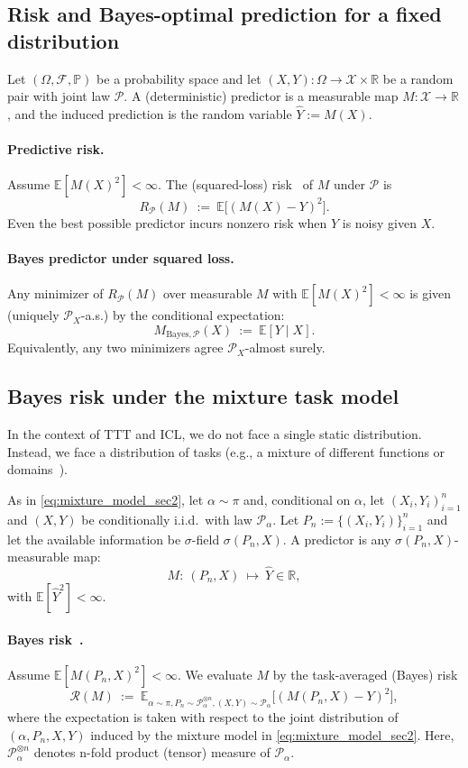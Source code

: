 \documentclass{article}
\theoremstyle{plain}
\theoremstyle{definition}
\theoremstyle{remark}
\begin{document}
\subsection{Risk and Bayes-optimal prediction for a fixed distribution}
Let $(\Omega,\mathcal F,\mathbb P)$ be a probability space and let $(X,Y):\Omega\to\mathcal X\times\mathbb R$ be a random pair with joint law $\mathcal P$.
A (deterministic) predictor is a measurable map $M:\mathcal X\to\mathbb R$, and the induced prediction is the random variable $\widehat Y:=M(X)$.


\paragraph{Predictive risk.}
Assume $\mathbb E[M(X)^2]<\infty$. The (squared-loss) risk~\citep{Bishop2006PRML,Murphy2022intro} of $M$ under $\mathcal P$ is
\[
    R_{\mathcal P}(M)\ :=\ \mathbb E\bigl[(M(X)-Y)^2\bigr].
\]
Even the best possible predictor incurs nonzero risk when $Y$ is noisy given $X$.

\paragraph{Bayes predictor under squared loss.}
Any minimizer of $R_{\mathcal P}(M)$ over measurable $M$ with $\mathbb E[M(X)^2]<\infty$ is given (uniquely $\mathcal P_X$-a.s.) by the conditional expectation:
\[
    M_{\mathrm{Bayes},\mathcal P}(X)\ :=\ \mathbb E[Y\mid X].
\]
Equivalently, any two minimizers agree $\mathcal P_X$-almost surely.


\subsection{Bayes risk under the mixture task model}
In the context of TTT and ICL, we do not face a single static distribution. Instead, we face a distribution of tasks (e.g., a mixture of different functions or domains~\citep{wakayama2025context}).

As in \eqref{eq:mixture_model_sec2}, let $\alpha\sim\pi$ and, conditional on $\alpha$, let $(X_i,Y_i)_{i=1}^n$ and $(X,Y)$ be conditionally i.i.d.\ with law $\mathcal P_\alpha$. Let $P_n:=\{(X_i,Y_i)\}_{i=1}^n$ and let the available information be $\sigma$-field $\sigma(P_n,X)$. A predictor is any $\sigma(P_n,X)$-measurable map:
\[
    M:\ (P_n,X)\ \mapsto\ \widehat Y\in\mathbb R,
\]
with $\mathbb E[\widehat Y^2]<\infty$.


\paragraph{Bayes risk~\citep{robert2007bayesian,Murphy2022intro}.}
Assume $\mathbb E[M(P_n,X)^2]<\infty$. We evaluate $M$ by the task-averaged (Bayes) risk
\[
    \mathcal R(M)\ :=\ \mathbb E_{\alpha\sim\pi, P_n\sim \mathcal{P}_{\alpha}^{\otimes n}, (X,Y)\sim \mathcal{P}_{\alpha} }\bigl[(M(P_n,X)-Y)^2\bigr],
\]
where the expectation is taken with respect to the joint distribution of $(\alpha,P_n,X,Y)$ induced by the mixture model in \eqref{eq:mixture_model_sec2}. Here, $\mathcal{P}_{\alpha}^{\otimes n}$ denotes n-fold product (tensor) measure of $\mathcal{P}_\alpha$.
\end{document}
